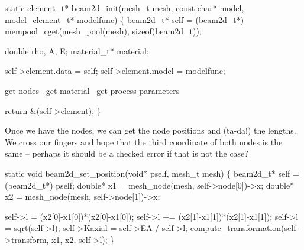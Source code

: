\nwendcode{}\nwdocspar

\nwenddocs{}\endmoddef
static element_t* beam2d_init(mesh_t mesh, const char* model,
                              model_element_t* modelfunc)
\{
    beam2d_t* self = (beam2d_t*) 
        mempool_cget(mesh_pool(mesh), sizeof(beam2d_t));

    double rho, A, E;
    material_t* material;

    self->element.data = self;
    self->element.model = modelfunc;

    \LA{}get nodes~{\nwtagstyle{}}\RA{}
    \LA{}get material~{\nwtagstyle{}}\RA{}
    \LA{}get process parameters~{\nwtagstyle{}}\RA{}

    return &(self->element);
\}

\nwendcode{}\nwdocspar

Once we have the nodes, we can get the node positions and (ta-da!)
the lengths.  We cross our fingers and hope that the third coordinate
of both nodes is the same -- perhaps it should be a checked error if
that is not the case?

\nwenddocs{}\plusendmoddef
static void beam2d_set_position(void* pself, mesh_t mesh)
\{
    beam2d_t* self = (beam2d_t*) pself;
    double* x1 = mesh_node(mesh, self->node[0])->x;
    double* x2 = mesh_node(mesh, self->node[1])->x;

    self->l  = (x2[0]-x1[0])*(x2[0]-x1[0]);
    self->l += (x2[1]-x1[1])*(x2[1]-x1[1]);
    self->l  = sqrt(self->l);
    self->Kaxial  = self->EA / self->l;
    compute_transformation(self->transform, x1, x2, self->l);
\}

